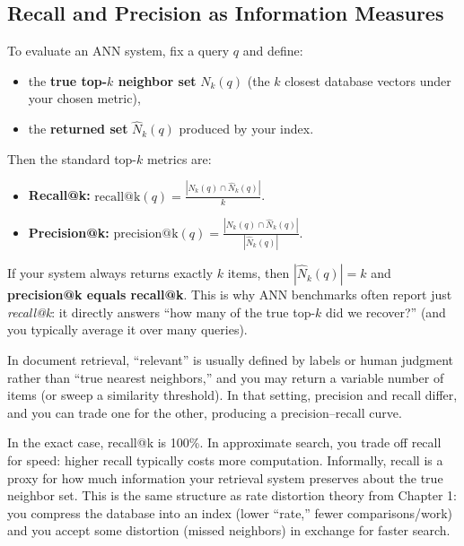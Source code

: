 \vspace{1.5em}

\subsection{Recall and Precision as Information Measures}

To evaluate an ANN system, fix a query $q$ and define:
\begin{itemize}
\item the \textbf{true top-$k$ neighbor set} $N_k(q)$ (the $k$ closest database vectors under your chosen metric),
\item the \textbf{returned set} $\hat N_k(q)$ produced by your index.
\end{itemize}

\vspace{0.5em}

Then the standard top-$k$ metrics are:
\begin{itemize}
\item \textbf{Recall@k:} $\mathrm{recall@k}(q) = \frac{|N_k(q) \cap \hat N_k(q)|}{k}$.
\item \textbf{Precision@k:} $\mathrm{precision@k}(q) = \frac{|N_k(q) \cap \hat N_k(q)|}{|\hat N_k(q)|}$.
\end{itemize}

\vspace{0.75em}

If your system always returns exactly $k$ items, then $|\hat N_k(q)| = k$ and \textbf{precision@k equals recall@k}. This is why ANN benchmarks often report just \emph{recall@k}: it directly answers ``how many of the true top-$k$ did we recover?'' (and you typically average it over many queries).

\vspace{0.75em}

In document retrieval, ``relevant'' is usually defined by labels or human judgment rather than ``true nearest neighbors,'' and you may return a variable number of items (or sweep a similarity threshold). In that setting, precision and recall differ, and you can trade one for the other, producing a precision--recall curve.

\vspace{1em}

In the exact case, recall@k is 100\%. In approximate search, you trade off recall for speed: higher recall typically costs more computation. Informally, recall is a proxy for how much information your retrieval system preserves about the true neighbor set. This is the same structure as rate distortion theory from Chapter 1: you compress the database into an index (lower ``rate,'' fewer comparisons/work) and you accept some distortion (missed neighbors) in exchange for faster search.

